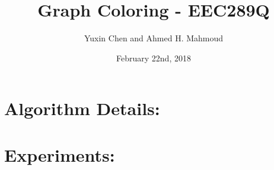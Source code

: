 \documentclass[12pt] {article}
\begin{document}
\title{Graph Coloring -  EEC289Q}
\author{Yuxin Chen and Ahmed H. Mahmoud}
\date{February 22nd, 2018}
\maketitle

\section{Algorithm Details:}


\section{Experiments:}
\end{document}
